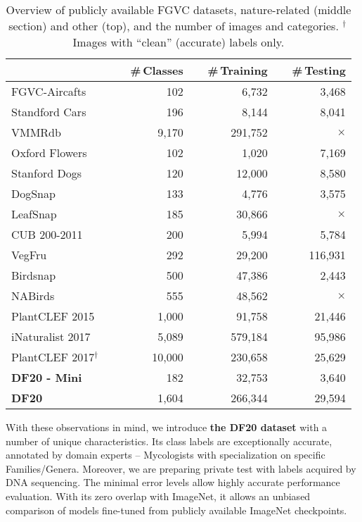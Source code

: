 \documentclass[10pt,twocolumn,letterpaper]{article}
\begin{document}
\begin{table}[b]
\small
\vspace{-0.2cm}
\begin{center}
\renewcommand{\arraystretch}{1.0}
\setlength{\tabcolsep}{0.4em}
\begin{tabular}{|l|r|r|r|}
\cline{2-4}
\multicolumn{1}{l|}{ } & ~~\#\,Classes & ~~\#\,Training & ~~\#\,Testing \\
\hline
FGVC-Aircafts\,\cite{aircafts}              &  102   &  6,732  &  3,468   \\
Standford Cars\,\cite{dataset-Cars}          &  196   &  8,144  &  8,041   \\
VMMRdb\,\cite{vmmrdb}                        &  9,170    &  291,752  &  $\times$   \\
\hline
Oxford Flowers\,\cite{dataset-flower}                 &    102 &   1,020 &   7,169  \\
Stanford Dogs\,\cite{dogsnap_dataset}                 &    120 &  12,000 &   8,580  \\
DogSnap\,\cite{dogsnap_dataset}                       &    133 &   4,776 &   3,575  \\
LeafSnap\,\cite{leafsnap}                             &    185 &  30,866 & $\times$ \\
CUB 200-2011\,\cite{dataset-CUBS}                     &    200 &   5,994 &   5,784  \\
VegFru\,\cite{vegfru_dataset}                         &    292 &  29,200 & 116,931  \\
Birdsnap\,\cite{dataset-birdsnap}                     &    500 &  47,386 &   2,443  \\
NABirds\,\cite{nabirds_dataset}                       &    555 &  48,562 & $\times$ \\
PlantCLEF 2015\,\cite{plantclef2015}                  &  1,000 &  91,758 &  21,446  \\
iNaturalist 2017\,\cite{inaturalist2017}              &  5,089 & 579,184 &  95,986  \\
PlantCLEF 2017{$^{\dagger}$}\,\cite{plantclef2017}~ & 10,000 & 230,658 &  25,629  \\
\hline \hline
\textbf{DF20 - Mini}        &    182 &  32,753 &   3,640  \\
\textbf{DF20}               &  1,604 & 266,344 &  29,594  \\
\hline
\end{tabular}
\end{center}
\caption{Overview of publicly available FGVC datasets, nature-related (middle section) and other (top), and the number of images and categories. {$^{\dagger}$}\,Images with ``clean'' (accurate) labels only.}
\label{table:fgvc_datasets}
\end{table}
With these observations in mind, we introduce {\bf the DF20 dataset} with a number of unique characteristics. Its class labels are exceptionally accurate, annotated by domain experts -- Mycologists with specialization on specific Families/Genera. Moreover, we are preparing private test with labels acquired by DNA sequencing. The minimal error levels allow highly accurate performance evaluation. 
With its zero overlap with ImageNet, it allows an unbiased comparison of models fine-tuned from publicly available ImageNet checkpoints.
\end{document}
